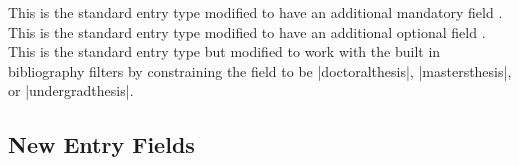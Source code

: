 \documentclass{ltxdockit}[2011/03/25]
\begin{document}
\begin{typelist}
		This is the standard  entry type modified to have an additional mandatory field .
		This is the standard  entry type modified to have an additional optional field .
		This is the standard  entry type but modified to work with the built in bibliography filters by constraining the field  to be |doctoralthesis|, |mastersthesis|, or |undergradthesis|.
\end{typelist}

\subsection{New Entry Fields}
\end{document}
